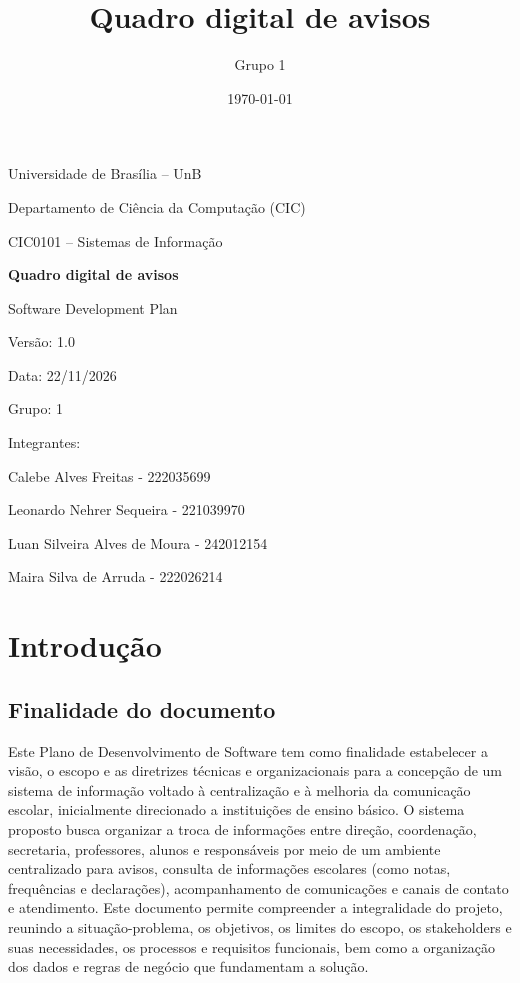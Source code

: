 \documentclass[a4paper,12pt]{report}
\title{Quadro digital de avisos}
\author{Grupo 1}
\date{\today}
\begin{document}
\begin{titlepage}
\centering

{\Large Universidade de Brasília -- UnB \par}
{\large Departamento de Ciência da Computação (CIC) \par}
{\large CIC0101 -- Sistemas de Informação \par}

\vspace{2cm}

{\Huge\bfseries Quadro digital de avisos\par}

\vspace{1cm}

{\Large Software Development Plan\par}

\vspace{1cm}

Versão: 1.0

Data: 22/11/2026

\vfill

Grupo: 1

Integrantes:

Calebe Alves Freitas - 222035699

Leonardo Nehrer Sequeira - 221039970

Luan Silveira Alves de Moura - 242012154

Maira Silva de Arruda - 222026214

\end{titlepage}

\tableofcontents

\chapter{Introdução}

\section{Finalidade do documento}
Este Plano de Desenvolvimento de Software tem como finalidade estabelecer a visão, o escopo e as diretrizes técnicas e organizacionais para a concepção de um sistema de informação voltado à centralização e à melhoria da comunicação escolar, inicialmente direcionado a instituições de ensino básico. O sistema proposto busca organizar a troca de informações entre direção, coordenação, secretaria, professores, alunos e responsáveis por meio de um ambiente centralizado para avisos, consulta de informações escolares (como notas, frequências e declarações), acompanhamento de comunicações e canais de contato e atendimento. Este documento permite compreender a integralidade do projeto, reunindo a situação-problema, os objetivos, os limites do escopo, os stakeholders e suas necessidades, os processos e requisitos funcionais, bem como a organização dos dados e regras de negócio que fundamentam a solução.
\end{document}

